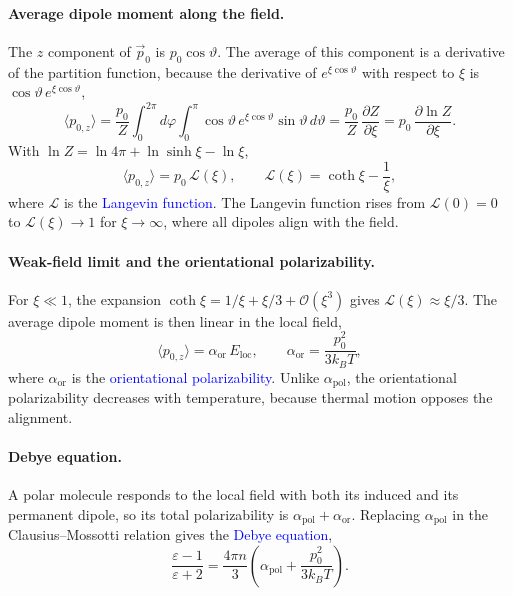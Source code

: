 \paragraph{Average dipole moment along the field.}
The $z$ component of $\vec p_0$ is $p_0\cos\vartheta$. The average of this component is a derivative of the partition function, because the derivative of $e^{\xi\cos\vartheta}$ with respect to $\xi$ is $\cos\vartheta\,e^{\xi\cos\vartheta}$,
\begin{equation*}
    \langle p_{0,z}\rangle = \frac{p_0}{Z}\int_0^{2\pi} d\varphi\int_0^\pi \cos\vartheta\,e^{\xi\cos\vartheta}\sin\vartheta\,d\vartheta
    = \frac{p_0}{Z}\,\frac{\partial Z}{\partial\xi}
    = p_0\,\frac{\partial\ln Z}{\partial\xi}.
\end{equation*}
With $\ln Z = \ln 4\pi + \ln\sinh\xi - \ln\xi$,
\begin{equation}
    \boxed{
    \langle p_{0,z}\rangle = p_0\,\mathcal{L}(\xi),
    \qquad
    \mathcal{L}(\xi) = \coth\xi - \frac{1}{\xi},
    }
\end{equation}
where $\mathcal{L}$ is the \textcolor{blue}{Langevin function}. The Langevin function rises from $\mathcal{L}(0) = 0$ to $\mathcal{L}(\xi) \to 1$ for $\xi \to \infty$, where all dipoles align with the field.

\paragraph{Weak-field limit and the orientational polarizability.}
For $\xi \ll 1$, the expansion $\coth\xi = 1/\xi + \xi/3 + \mathcal{O}(\xi^3)$ gives $\mathcal{L}(\xi) \approx \xi/3$. The average dipole moment is then linear in the local field,
\begin{equation}
    \boxed{
    \langle p_{0,z}\rangle = \alpha_{\text{or}}\,E_{\text{loc}},
    \qquad
    \alpha_{\text{or}} = \frac{p_0^2}{3k_BT},
    }
\end{equation}
where $\alpha_{\text{or}}$ is the \textcolor{blue}{orientational polarizability}. Unlike $\alpha_{\text{pol}}$, the orientational polarizability decreases with temperature, because thermal motion opposes the alignment.

\paragraph{Debye equation.}
A polar molecule responds to the local field with both its induced and its permanent dipole, so its total polarizability is $\alpha_{\text{pol}} + \alpha_{\text{or}}$. Replacing $\alpha_{\text{pol}}$ in the Clausius--Mossotti relation gives the \textcolor{blue}{Debye equation},
\begin{equation}
    \boxed{
    \frac{\varepsilon - 1}{\varepsilon + 2} = \frac{4\pi n}{3}\left(\alpha_{\text{pol}} + \frac{p_0^2}{3k_BT}\right).
    }
\end{equation}

